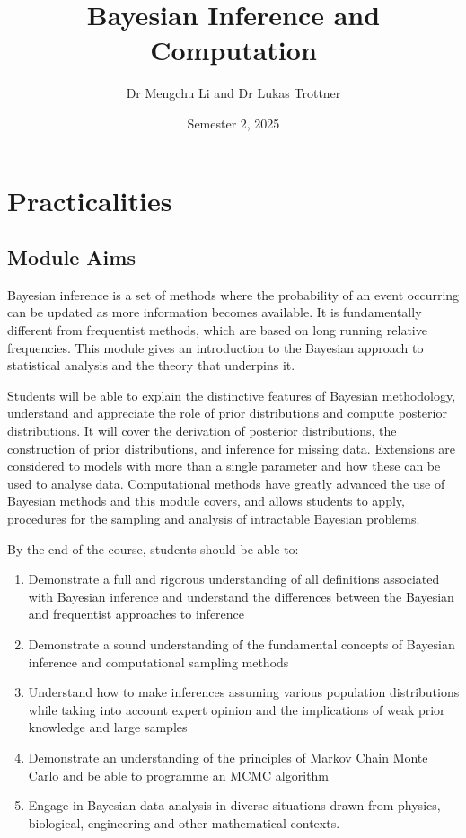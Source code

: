 \documentclass[
]{book}
\title{Bayesian Inference and Computation}
\author{Dr Mengchu Li and Dr Lukas Trottner}
\date{Semester 2, 2025}
\providecommand{\tightlist}{%
  \setlength{\itemsep}{0pt}\setlength{\parskip}{0pt}}
\theoremstyle{definition}
\theoremstyle{definition}
\theoremstyle{definition}
\theoremstyle{definition}
\theoremstyle{remark}
\begin{document}
\maketitle

{
\setcounter{tocdepth}{1}
\tableofcontents
}
\hypertarget{practicalities}{%
\chapter*{Practicalities}\label{practicalities}}

\hypertarget{module-aims}{%
\section{Module Aims}\label{module-aims}}

Bayesian inference is a set of methods where the probability of an event
occurring can be updated as more information becomes available. It is
fundamentally different from frequentist methods, which are based on
long running relative frequencies. This module gives an introduction to
the Bayesian approach to statistical analysis and the theory that
underpins it.

Students will be able to explain the distinctive features of Bayesian
methodology, understand and appreciate the role of prior distributions
and compute posterior distributions. It will cover the derivation of
posterior distributions, the construction of prior distributions, and
inference for missing data. Extensions are considered to models with
more than a single parameter and how these can be used to analyse data.
Computational methods have greatly advanced the use of Bayesian methods
and this module covers, and allows students to apply, procedures for the
sampling and analysis of intractable Bayesian problems.

By the end of the course, students should be able to:

\begin{enumerate}
\def\labelenumi{\arabic{enumi}.}
\tightlist
\item
  Demonstrate a full and rigorous understanding of all definitions
  associated with Bayesian inference and understand the differences
  between the Bayesian and frequentist approaches to inference
\item
  Demonstrate a sound understanding of the fundamental concepts of
  Bayesian inference and computational sampling methods
\item
  Understand how to make inferences assuming various population
  distributions while taking into account expert opinion and the
  implications of weak prior knowledge and large samples
\item
  Demonstrate an understanding of the principles of Markov Chain Monte
  Carlo and be able to programme an MCMC algorithm
\item
  Engage in Bayesian data analysis in diverse situations drawn from
  physics, biological, engineering and other mathematical contexts.
\end{enumerate}
\end{document}
